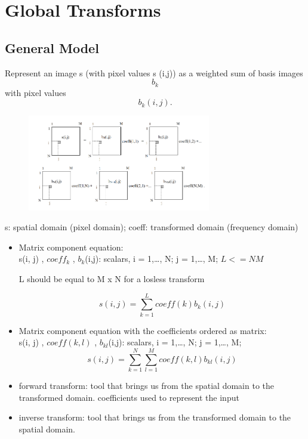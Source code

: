 \documentclass{article}
\begin{document}
\section{Global Transforms}
\subsection{General Model}
Represent an image s (with pixel values s (i,j)) as a weighted sum of basis images \[ b_k \]
 with pixel values \[b_k(i,j).\]
\begin{figure}[htp]
    \centering
\includegraphics[width=8cm]{images/1.png}
\end{figure}

s: spatial domain (pixel domain); coeff: transformed domain (frequency domain)
\begin{itemize}
\item Matrix component equation: \\
s(i, j) , $coeff_{k}$ , $b_{k}$(i,j): scalars, i = 1,…, N; j = 1,…, M; $L <= NM$

L should be equal to M x N for a losless transform

\begin{equation}
    s(i,j) = \sum_{k=1}^{L} coeff(k) b_k(i,j)
\end{equation}
\item Matrix component equation with the coefficients ordered as matrix: \\
s(i, j) , $coeff(k,l)$ , $b_{kl}$(i,j): scalars, i = 1,…, N; j = 1,…, M; 
\begin{equation}
    s(i,j) = \sum_{k=1}^{N}\sum_{l=1}^{M} coeff(k,l) b_{kl}(i,j)
\end{equation}
\end{itemize}

\begin{itemize}
    \item forward transform: tool that brings us from the spatial domain to the transformed domain.
    coefficients used to represent the input
    \item inverse transform: tool that brings us from the transformed domain to the spatial domain.
\end{itemize}
\end{document}
